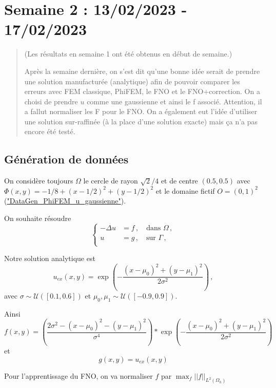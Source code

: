 \section{Semaine 2 : 13/02/2023 - 17/02/2023}
\graphicspath{{semaines/semaine_2/images/}}

\begin{abstract}
	(Les résultats en semaine 1 ont été obtenus en début de semaine.)
	
	Après la semaine dernière, on s'est dit qu'une bonne idée serait de prendre une solution manufacturée (analytique) afin de pouvoir comparer les erreurs avec FEM classique, PhiFEM, le FNO et le FNO+correction. On a choisi de prendre $u$ comme une gaussienne et ainsi le f associé. Attention, il a fallut normaliser les F pour le FNO. On a également eut l'idée d'utiliser une solution sur-raffinée (à la place d'une solution exacte) mais ça n'a pas encore été testé.
\end{abstract}

\subsection{Génération de données}

On considère toujours $\Omega$ le cercle de rayon $\sqrt{2}/4$ et de centre $(0.5,0.5)$ avec $\Phi(x,y)=-1/8+(x-1/2)^2+(y-1/2)^2$ et le domaine fictif $O=(0,1)^2$ (\href{https://colab.research.google.com/drive/1Ymb1XZU80fwy7XxkL5_SsNs-ZVIVs3dm#scrollTo=GYtkSETwcBRp}{"DataGen\_PhiFEM\_u\_gaussienne"}).

On souhaite résoudre 
\begin{equation*}
	\begin{cases}
		-\Delta u &= f\,, \quad \text{dans $\Omega$}\,, \\
		u &= g\,, \quad \text{sur $\Gamma$}\,, \\
	\end{cases}
\end{equation*}

Notre solution analytique est
$$u_{ex}(x,y) = \exp\left(-\frac{(x-\mu_0)^2 + (y-\mu_1)^2}{2\sigma^2}\right)\,, $$ 
avec $\sigma \sim \mathcal{U}([0.1,0.6])$ et $\mu_0, \mu_1 \sim \mathcal{U}([-0.9, 0.9])$.

Ainsi 
$$f(x,y)=\left(\frac{2\sigma^2-(x-\mu_0)^2-(y-\mu_1)^2}{\sigma^4}\right)*\exp\left(-\frac{(x-\mu_0)^2 + (y-\mu_1)^2}{2\sigma^2}\right)$$
et
$$g(x,y)=u_{ex}(x,y)$$

Pour l'apprentissage du FNO, on va normaliser $f$ par $\max_f ||f||_{L^2(\Omega_h)}$

